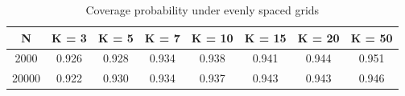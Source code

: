 \begin{table}[!h]
\centering
\caption{\label{tab:coverage_even}Coverage probability under evenly spaced grids}
\centering
\begin{tabular}[t]{cccccccc}
\toprule
N & K = 3 & K = 5 & K = 7 & K = 10 & K = 15 & K = 20 & K = 50\\
\midrule
2000 & 0.926 & 0.928 & 0.934 & 0.938 & 0.941 & 0.944 & 0.951\\
20000 & 0.922 & 0.930 & 0.934 & 0.937 & 0.943 & 0.943 & 0.946\\
\bottomrule
\end{tabular}
\end{table}